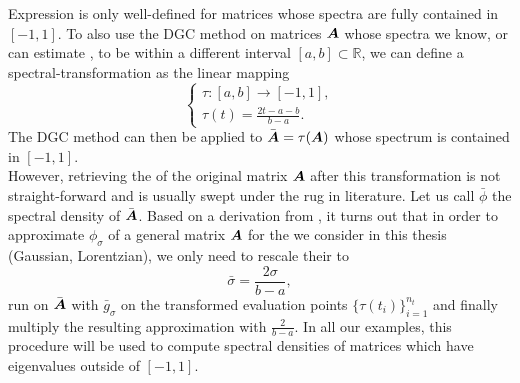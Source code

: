 Expression  is only well-defined for matrices whose spectra are fully
contained in $[-1, 1]$. To also use the \gls{DGC} method on matrices $\boldsymbol{A}$ whose
spectra we know, or can estimate \cite{lin2016review, zhou2011spectrum}, to be
within a different interval $[a, b] \subset \mathbb{R}$,
we can define a \gls{spectral-transformation} as the linear mapping
\begin{equation}
    \begin{cases}
        \tau : [a, b] \to [-1, 1], \\
        \tau(t) = \frac{2t - a - b}{b - a}.
    \end{cases}
    \label{equ:2-chebyshev-spectral-transformation}
\end{equation}
The \gls{DGC} method can then be applied to $\bar{\boldsymbol{A}} = \tau(\boldsymbol{A})$ whose
spectrum is contained in $[-1, 1]$.\\

However, retrieving the  of the original
matrix $\boldsymbol{A}$ after this transformation is not straight-forward
and is usually swept under the rug in literature.
Let us call $\bar{\phi}$ the spectral density of $\bar{\boldsymbol{A}}$.
Based on a derivation from , it turns out that in order
to approximate $\phi_{\sigma}$ of a general matrix $\boldsymbol{A}$
for the  we consider
in this thesis (Gaussian, Lorentzian), we only need to rescale their
 to
\begin{equation}
    \bar{\sigma} = \frac{2\sigma}{b - a},
    \label{equ:2-chebyshev-sigma-transformation}
\end{equation}
run  on $\bar{\boldsymbol{A}}$ with $\bar{g}_{\sigma}$
on the transformed evaluation points $\{ \tau(t_i) \}_{i=1}^{n_t}$ and finally
multiply the resulting approximation with $\frac{2}{b-a}$.
In all our examples, this procedure will be used to compute spectral densities
of matrices which have eigenvalues outside of $[-1, 1]$.\\

